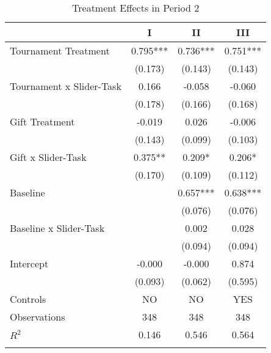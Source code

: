 \begin{table}[H]
\caption{Treatment Effects in Period 2}%
\begin{center}%
{\small\renewcommand{\arraystretch}{0.8}%
{\setlength{\tabcolsep}{7pt}
\begin{tabular}{lccc}
\hline\hline\noalign{\smallskip}
                    &\multicolumn{1}{c}{I}&\multicolumn{1}{c}{II}&\multicolumn{1}{c}{III}\\
\hline\noalign{\smallskip}
Tournament Treatment&       0.795***&       0.736***&       0.751***\\
                    &     (0.173)   &     (0.143)   &     (0.143)  \\[4mm]
Tournament x Slider-Task&       0.166   &      -0.058   &      -0.060     \\
                    &     (0.178)   &     (0.166)   &     (0.168)    \\[4mm]
Gift Treatment      &      -0.019   &       0.026   &      -0.006   \\
                    &     (0.143)   &     (0.099)   &     (0.103)    \\[4mm]
Gift x Slider-Task  &       0.375** &       0.209*  &       0.206*   \\
                    &     (0.170)   &     (0.109)   &     (0.112)    \\[4mm]
Baseline            &               &       0.657***&       0.638***\\
                    &               &     (0.076)   &     (0.076)      \\[4mm]
Baseline x Slider-Task&               &       0.002   &       0.028    \\
                    &               &     (0.094)   &     (0.094)     \\[4mm]
Intercept           &      -0.000   &      -0.000   &       0.874    \\
                    &     (0.093)   &     (0.062)   &     (0.595)    \\[2mm]
\hline
Controls           &      NO   &      NO   &       YES    \\
\hline
Observations        &         348   &         348   &         348     \\
$R^2$               &       0.146   &       0.546   &       0.564      \\
\hline\hline\noalign{\medskip}
\end{tabular}}
\begin{minipage}{0.8\textwidth}
\footnotesize

\end{minipage}}
\end{center}
\end{table}
